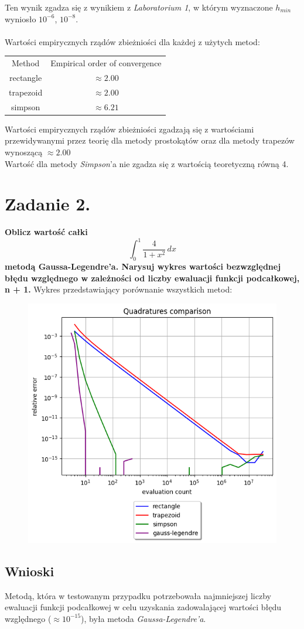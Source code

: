 \documentclass{article}
\begin{document}
Ten wynik zgadza się z wynikiem z \textit{Laboratorium 1}, w którym
wyznaczone $h_{min}$ wyniosło $10^{-6}$, $10^{-8}$. \\\\
\null\quad
Wartości empirycznych rządów zbieżniości dla każdej z
użytych metod:
\begin{center}
  \begin{tabular}{c c} 
   Method & Empirical order of convergence\\
   rectangle & $\approx 2.00$\\
   trapezoid & $\approx 2.00$\\
   simpson & $\approx 6.21$
  \end{tabular}
\end{center}
\null\quad
Wartości empirycznych rządów zbieżniości zgadzają się z
wartościami przewidywanymi przez teorię dla metody prostokątów oraz
dla metody trapezów wynoszącą $\approx 2.00$\\
Wartość dla metody \textit{Simpson}'a nie zgadza się z
wartością teoretyczną równą 4.

\section*{Zadanie 2.}
\textbf{Oblicz wartość całki $$ \int_{0}^{1} \frac{4}{1+x^2} \,dx $$
metodą Gaussa-Legendre’a. Narysuj wykres wartości bezwzględnej
błędu względnego w zależności od liczby ewaluacji funkcji
podcałkowej, n + 1.}
\newpage
Wykres przedstawiający porównanie wszystkich metod:
\begin{figure}[H]
  \includegraphics[width=\linewidth]{figures/GL.png}
\end{figure}


\subsection*{Wnioski}
\null\quad Metodą, która w testowanym przypadku potrzebowała
najmniejszej liczby ewaluacji funkcji podcałkowej w celu uzyskania
zadowalającej wartości błędu względnego ($\approx 10^{-15}$), była
metoda \textit{Gaussa-Legendre'a}.
\end{document}
